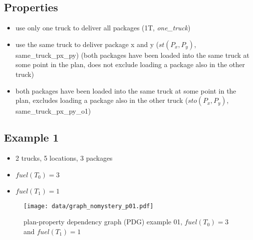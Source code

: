 \subsection*{Properties}

\begin{itemize}
	\item use only one truck to deliver all packages (1T, \emph{one\_truck})
	\item use the same truck to deliver package x and y ($st(P_x, P_y)$, {same\_truck\_px\_py})
		(both packages have been loaded into the same truck at some point in the plan, does not exclude loading a package also in the other truck)
	\item both packages have been loaded into the same truck at some point in the plan, excludes loading a package also in the other truck
		($sto(P_x, P_y)$, {same\_truck\_px\_py\_o1})
\end{itemize}

\subsection*{Example 1}

	\begin{itemize}
		\item 2 trucks, 5 locations, 3 packages
		\item $fuel(T_0) = 3$
		\item $fuel(T_1) = 1$
	\end{itemize}

\begin{center}
\end{center}


\begin{figure}[ht]
\begin{center}
	\texttt{[image: data/graph\_nomystery\_p01.pdf]}
\end{center}
\caption{plan-property dependency graph (PDG) example 01, $fuel(T_0) = 3$ and $fuel(T_1) = 1$}
\end{figure}


